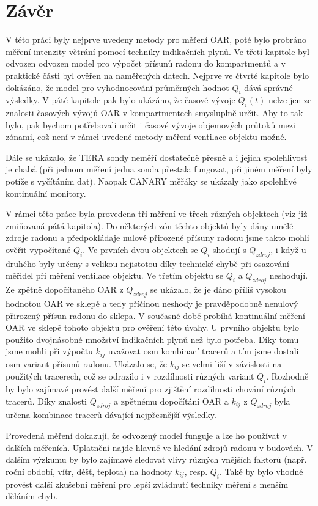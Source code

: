 \chapter{Závěr}
V této práci byly nejprve uvedeny metody pro měření OAR, poté bylo probráno měření intenzity větrání pomocí techniky indikačních plynů. Ve třetí kapitole byl odvozen odvozen model pro výpočet přísunů radonu do kompartmentů a v praktické části byl ověřen na naměřených datech. Nejprve ve čtvrté kapitole bylo dokázáno, že model pro vyhodnocování průměrných hodnot $Q_i$ dává správné výsledky. V páté kapitole pak bylo ukázáno, že časové vývoje $Q_i(t)$ nelze jen ze znalosti časových vývojů OAR v kompartmentech smysluplně určit. Aby to tak bylo, pak bychom potřebovali určit i časové vývoje objemových průtoků mezi zónami, což není v rámci uvedené metody měření ventilace objektu možné.

Dále se ukázalo, že TERA sondy neměří dostatečně přesně a i jejich spolehlivost je chabá (při jednom měření jedna sonda přestala fungovat, při jiném měření byly potíže s vyčítáním dat). Naopak CANARY měřáky se ukázaly jako spolehlivé kontinuální monitory.

V rámci této práce byla provedena tři měření ve třech různých objektech (viz již zmiňovaná pátá kapitola). Do některých zón těchto objektů byly dány umělé zdroje radonu a předpokládaje nulové přirozené přísuny radonu jsme takto mohli ověřit vypočítané $Q_i$. Ve prvních dvou objektech se $Q_i$ shodují s $Q_{zdroj}$, i když u druhého byly určeny s velikou nejistotou díky technické chybě při osazování měřidel při měření ventilace objektu. Ve třetím objektu se $Q_i$ a $Q_{zdroj}$ neshodují. Ze zpětně dopočítaného OAR z $Q_{zdroj}$ se ukázalo, že je dáno příliš vysokou hodnotou OAR ve sklepě a tedy příčinou neshody je pravděpodobně nenulový přirozený přísun radonu do sklepa. V současné době probíhá kontinuální měření OAR ve sklepě tohoto objektu pro ověření
této úvahy. U prvního objektu bylo použito dvojnásobné množství indikačních plynů než bylo potřeba. Díky tomu jsme mohli při výpočtu $k_{ij}$ uvažovat osm kombinací tracerů a tím jsme dostali osm variant přísunů radonu. Ukázalo se, že $k_{ij}$ se velmi liší v závislosti na použitých tracerech, což se odrazilo i v rozdílnosti různých variant $Q_i$. Rozhodně by bylo zajímavé provést další měření pro zjištění rozdílnosti chování různých tracerů. Díky znalosti $Q_{zdroj}$ a zpětnému dopočítání OAR a $k_{ij}$ z $Q_{zdroj}$ byla určena kombinace tracerů dávající nejpřesnější výsledky.

Provedená měření dokazují, že odvozený model funguje a lze ho používat v dalších měřeních. Uplatnění najde hlavně ve hledání zdrojů radonu v budovách. V dalším výzkumu by bylo zajímavé sledovat vlivy různých vnějších faktorů (např. roční období, vítr, déšť, teplota) na hodnoty $k_{ij}$, resp. $Q_i$. Také by bylo vhodné provést další zkušební měření pro lepší zvládnutí techniky měření s menším děláním chyb.

